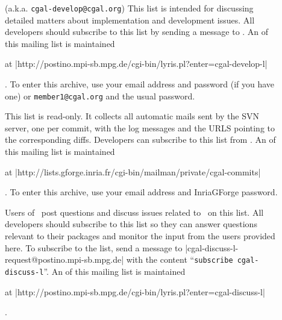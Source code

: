 \begin{description}
\item[]
     (a.k.a. \texttt{cgal-develop@cgal.org})
     This list is intended for discussing detailed matters
     about implementation and development issues.  All developers should
     subscribe to this list by sending a message to
     .
     An 
     of this mailing list is maintained%
     \begin{ccTexOnly}
     at \nonlinkedpath|http://postino.mpi-sb.mpg.de/cgi-bin/lyris.pl?enter=cgal-develop-l|
     \end{ccTexOnly}.  To enter this archive, use your email address and
     password (if you have one) or
     \texttt{member1@cgal.org} and the usual password.

\item[]
     This list is read-only.  It collects all automatic mails sent by
     the SVN server, one per commit, with the log messages and the URLS
     pointing to the corresponding diffs.
     Developers can subscribe to this list from
     .
     An 
     of this mailing list is maintained%
     \begin{ccTexOnly}
     at \nonlinkedpath|http://lists.gforge.inria.fr/cgi-bin/mailman/private/cgal-commits|
     \end{ccTexOnly}.  To enter this archive, use your email address and InriaGForge
     password.

\item[]
     Users of \cgal\ post questions and discuss issues
     related to \cgal\ on this list.  All developers should subscribe to this
     list so they can answer questions relevant to their packages and monitor
     the input from the users provided here.
     To subscribe to the list, send a message to
     {\nonlinkedpath|cgal-discuss-l-request@postino.mpi-sb.mpg.de|}
     with the content ``\texttt{subscribe cgal-discuss-l}''.
     An 
     of this mailing list is maintained%
     \begin{ccTexOnly}
     at \nonlinkedpath|http://postino.mpi-sb.mpg.de/cgi-bin/lyris.pl?enter=cgal-discuss-l|
     \end{ccTexOnly}.


\end{description}
